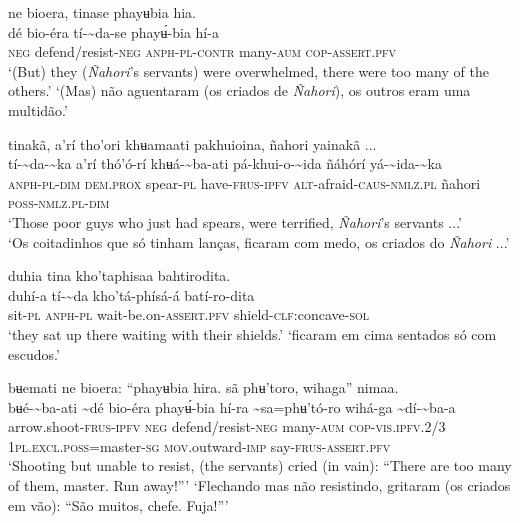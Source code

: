 \documentclass[output=paper,
modfonts,nonflat
]{langsci/langscibook}
\begin{document}
\ea ne bioera, tinase phayʉbia hia.\\[.3em]
\gll {\textasciitilde}dé	bio-éra	tí-{\textasciitilde}da-se	phayʉ́-bia	hí-a\\
     \textsc{neg}	defend/resist\textsc{-neg}	\textsc{anph-pl-contr}	many-\textsc{aum}	\textsc{cop-assert.pfv}\\
\glt ‘(But) they (\textit{Ñahori}'s servants) were overwhelmed, there were too many of the others.’
\glt ‘(Mas) não aguentaram (os criados de \textit{Ñahori}), os outros eram uma multidão.’
\z 

\ea tinakã, a’rí tho'ori khʉamaati pakhuioina, ñahori yainakã ...\\[.3em]
\gll tí-{\textasciitilde}da-{\textasciitilde}ka	a’rí	thó'ó-rí	khʉá-{\textasciitilde}ba-ati	pá-khui-o-{\textasciitilde}ida  ñáhórí	yá-{\textasciitilde}ida-{\textasciitilde}ka\\
     \textsc{anph-pl-dim}	\textsc{dem.prox}	spear-\textsc{pl}	have-\textsc{frus-ipfv}	\textsc{alt}-afraid-\textsc{caus-nmlz.pl} ñahori	\textsc{poss-nmlz.pl-dim}\\
\glt ‘Those poor guys who just had spears, were terrified, \textit{Ñahori}'s servants ...’\\
\glt ‘Os coitadinhos que só tinham lanças, ficaram com medo, os criados do \textit{Ñahori} ...’
\z

\ea duhia tina kho'taphisaa bahtirodita.\\[.3em]
\gll duhí-a	tí-{\textasciitilde}da	kho'tá-phísá{\footnotemark}-á	batí-ro-dita\\
     sit-\textsc{pl}	\textsc{anph-pl}	wait-be.on-\textsc{assert.pfv}	shield-\textsc{clf:}concave-\textsc{sol}\\
\glt ‘they sat up there waiting with their shields.’
\glt ‘ficaram em cima sentados só com escudos.’
\z 

\ea bʉemati ne bioera: “phayʉbia hira. sã phʉ'toro, wihaga” nimaa.\\[.3em]
\gll bʉé-{\textasciitilde}ba-ati	{\textasciitilde}dé	bio-éra phayʉ́-bia	hí-ra	{\textasciitilde}sa=phʉ'tó-ro	wihá-ga	{\textasciitilde}dí-{\textasciitilde}ba-a\\
     arrow.shoot-\textsc{frus-ipfv}	\textsc{neg}	defend/resist\textsc{-neg} many-\textsc{aum}	\textsc{cop-vis.ipfv.}2/3	1\textsc{pl.excl.poss}=master\textsc{-sg}	\textsc{mov.}outward-\textsc{imp}	say-\textsc{frus-assert.pfv}\\
\glt ‘Shooting but unable to resist, (the servants) cried (in vain): “There are too many of them, master. Run away!”’
\glt ‘Flechando mas não resistindo, gritaram (os criados em vão): “São muitos, chefe. Fuja!”’ 
\z 
\end{document}
